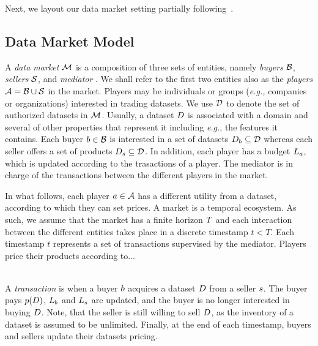


Next, we layout our data market setting partially following~\cite{castro2020data}.

\subsection{Data Market Model}\label{sec:market_model}

A \emph{data market} $\mathcal{M}$ is a composition of three sets of entities, namely \emph{buyers} $\mathcal{B}$, \emph{sellers} $\mathcal{S}$, and \emph{mediator} \mediator. We shall refer to the first two entities also as the \emph{players} $\mathcal{A} = \mathcal{B}\cup\mathcal{S}$ in the market. Players may be individuals or groups (\emph{e.g.,} companies or organizations) interested in trading datasets. We use $\mathcal{D}$ to denote the set of authorized datasets in $\mathcal{M}$. Usually, a dataset $D$ is associated with a domain and several of other properties that represent it including \emph{e.g.}, the features it contains. Each buyer $b\in\mathcal{B}$ is interested in a set of datasets $D_{b}\subseteq\mathcal{D}$ whereas each seller offers a set of products $D_{s}\subseteq\mathcal{D}$. In addition, each player has a budget $L_{a}$, which is updated according to the trasactions of a player. The mediator is in charge of the transactions between the different players in the market.

\begin{example}
\end{example}

In what follows, each player $a\in\mathcal{A}$ has a different utility from a dataset, according to which they can set prices. A market is a temporal ecosystem. As such, we assume that the market has a finite horizon $T$ and each interaction between the different entities takes place in a discrete timestamp $t<T$. Each timestamp $t$ represents a set of transactions supervised by the mediator. Players price their products according to...  

\\

A \emph{transaction} is when a buyer $b$ acquires a dataset $D$ from a seller $s$. The buyer pays $p(D)$, $L_{b}$ and $L_{s}$ are updated, and the buyer is no longer interested in buying $D$. Note, that the seller is still willing to sell $D$, as the inventory of a dataset is assumed to be unlimited. Finally, at the end of each timestamp, buyers and sellers update their datasets pricing.

